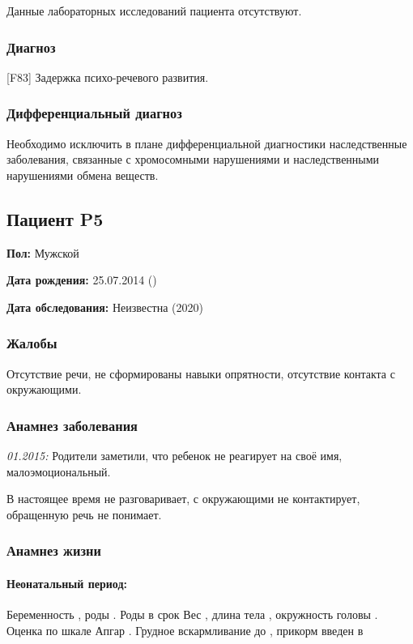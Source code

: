 \documentclass[a4paper,14pt]{extarticle}
\newcommand{\gramm}{г}
\newcommand{\cm}{см}
\newcommand{\months}{мес.}
\newcommand{\weeks}{нед.}
\newcommand{\pdate}[1]{\emph{#1:} }
\newcommand{\DS}[2]{[#2] #1}
\begin{document}
Данные лабораторных исследований пациента отсутствуют.

\subsubsection*{Диагноз}

\DS{Задержка психо-речевого развития}{F83}.

\subsubsection*{Дифференциальный диагноз}

Необходимо исключить в плане дифференциальной диагностики наследственные заболевания, связанные с хромосомными нарушениями и наследственными нарушениями обмена  веществ. 

\newpage
\subsection*{Пациент P5}

\textbf{Пол:} Мужской

\textbf{Дата рождения:} 25.07.2014 ()

\textbf{Дата обследования:} Неизвестна (2020)

\subsubsection*{Жалобы}

Отсутствие речи, не сформированы навыки опрятности, отсутствие контакта с окружающими.

\subsubsection*{Анамнез заболевания}

\pdate{01.2015} Родители заметили, что ребенок не реагирует на своё имя, малоэмоциональный.

В настоящее время не разговаривает, с окружающими не контактирует, обращенную речь не понимает.

\subsubsection*{Анамнез жизни}

\paragraph{Неонатальный период:} Беременность , роды . Роды в срок \numprint[\weeks]{40}
Вес \numprint[\gramm]{2800}, длина тела \numprint[\cm]{50}, окружность головы \numprint[\cm]{34}. Оценка по шкале Апгар . Грудное вскармливание до  \numprint[\months]{4}, прикорм введен в \numprint[\months]{6}
\end{document}
